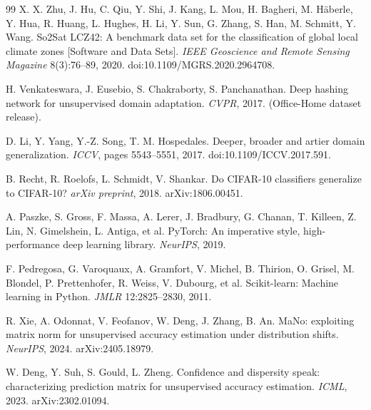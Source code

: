 \begin{thebibliography}{99}
 X. X. Zhu, J. Hu, C. Qiu, Y. Shi, J. Kang, L. Mou,
H. Bagheri, M. H\"aberle, Y. Hua, R. Huang, L. Hughes, H. Li, Y. Sun, G. Zhang,
S. Han, M. Schmitt, Y. Wang. So2Sat LCZ42: A benchmark data set for the classification
of global local climate zones [Software and Data Sets].
\emph{IEEE Geoscience and Remote Sensing Magazine} 8(3):76--89, 2020.
doi:10.1109/MGRS.2020.2964708.

 H. Venkateswara, J. Eusebio, S. Chakraborty,
S. Panchanathan. Deep hashing network for unsupervised domain adaptation.
\emph{CVPR}, 2017. (Office-Home dataset release).

 D. Li, Y. Yang, Y.-Z. Song, T. M. Hospedales.
Deeper, broader and artier domain generalization. \emph{ICCV}, pages 5543--5551, 2017.
doi:10.1109/ICCV.2017.591.

 B. Recht, R. Roelofs, L. Schmidt, V. Shankar.
Do CIFAR-10 classifiers generalize to CIFAR-10? \emph{arXiv preprint},
2018. arXiv:1806.00451.

 A. Paszke, S. Gross, F. Massa, A. Lerer, J. Bradbury,
G. Chanan, T. Killeen, Z. Lin, N. Gimelshein, L. Antiga, et al.
PyTorch: An imperative style, high-performance deep learning library.
\emph{NeurIPS}, 2019.

 F. Pedregosa, G. Varoquaux, A. Gramfort, V. Michel,
B. Thirion, O. Grisel, M. Blondel, P. Prettenhofer, R. Weiss, V. Dubourg, et al.
Scikit-learn: Machine learning in Python. \emph{JMLR} 12:2825--2830, 2011.

 R. Xie, A. Odonnat, V. Feofanov, W. Deng, J. Zhang, B. An.
MaNo: exploiting matrix norm for unsupervised accuracy estimation under distribution
shifts. \emph{NeurIPS}, 2024. arXiv:2405.18979.

 W. Deng, Y. Suh, S. Gould, L. Zheng. Confidence and
dispersity speak: characterizing prediction matrix for unsupervised accuracy estimation.
\emph{ICML}, 2023. arXiv:2302.01094.


\end{thebibliography}
